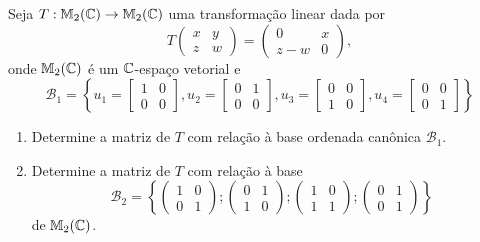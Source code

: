 \documentclass[12pt]{exam}
\begin{document}
\begin{exercicio}
    Seja $T : \mathbb{M}_2(\mathbb{C}) \to \mathbb{M}_2(\mathbb{C})$ uma transformação linear dada por
    \[
    T \begin{pmatrix}
        x & y\\
        z & w
    \end{pmatrix} = \begin{pmatrix}
        0 & x\\
        z - w & 0
    \end{pmatrix},
    \]
    onde $\mathbb{M}_2(\mathbb{C})$ é um $\mathbb{C}$-espaço vetorial
    e
    \[
    \mathcal{B}_1 = \left\{u_1 = \begin{bmatrix}
        1 & 0\\0 & 0
    \end{bmatrix}, u_2 = \begin{bmatrix}
        0 & 1\\0 & 0
    \end{bmatrix}, u_3 = \begin{bmatrix}
        0 & 0\\1 & 0
    \end{bmatrix}, u_4 = \begin{bmatrix}
        0 & 0\\0 & 1
    \end{bmatrix}\right\}
    \]
    \begin{enumerate}[label={\alph*})]
        \item Determine a matriz de $T$ com relação à base ordenada canônica $\mathcal{B}_1$.

        \item Determine a matriz de $T$ com relação à base
        \[
        \mathcal{B}_2 = \left\{\begin{pmatrix}
            1 & 0\\
            0 & 1
        \end{pmatrix}; \begin{pmatrix}
            0 & 1\\
            1 & 0
        \end{pmatrix}; \begin{pmatrix}
            1 & 0\\
            1 & 1
        \end{pmatrix}; \begin{pmatrix}
            0 & 1\\
            0 & 1
        \end{pmatrix}\right\}
        \]
        de $\mathbb{M}_2(\mathbb{C})$.


\end{enumerate}
\end{exercicio}
\end{document}

